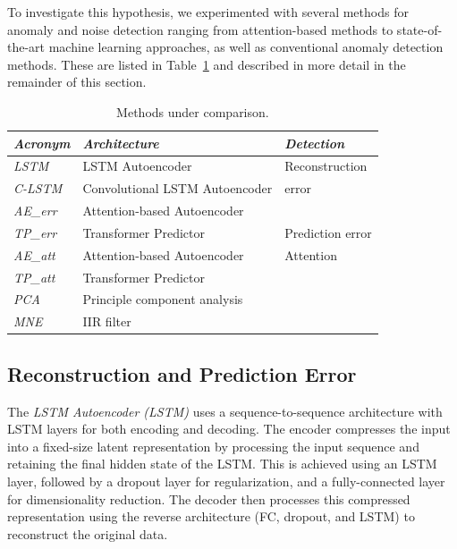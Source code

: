 \documentclass[runningheads]{llncs}
\begin{document}
To investigate this hypothesis, we experimented with several methods
for anomaly and noise detection ranging from attention-based methods
to state-of-the-art machine learning approaches, as well as
conventional anomaly detection methods. These are listed in
Table~\ref{tab1} and described in more detail in the remainder of this
section.


\begin{table}[bt]
\centering
\caption{Methods under comparison.}
\label{tab1}
\begin{tabular}{lp{4cm}p{2cm}}
\toprule
\emph{Acronym}   & \emph{Architecture}& \emph{Detection}  \\
\midrule
\textit{LSTM}    & LSTM Autoencoder   & Reconstruction  \\
\textit{C-LSTM}  & Convolutional LSTM Autoencoder
                                      & error  \\
\textit{AE\_err} & Attention-based Autoencoder
                                      &   \\
\midrule
\textit{TP\_err} & Transformer Predictor
                                      & Prediction error  \\
\midrule
\textit{AE\_att} & Attention-based Autoencoder
                                      & Attention \\
\textit{TP\_att} & Transformer Predictor &  \\
\midrule
\textit{PCA}     & \multicolumn{2}{l}{Principle component analysis} \\
\textit{MNE}     & \multicolumn{2}{l}{IIR filter} \\
\bottomrule
\end{tabular} 
\end{table}


\subsection{Reconstruction and Prediction Error}

The \emph{LSTM Autoencoder (LSTM)} uses a sequence-to-sequence
architecture with LSTM layers for both encoding and decoding. The
encoder compresses the input into a fixed-size latent representation
by processing the input sequence and retaining the final hidden state
of the LSTM. This is achieved using an LSTM layer, followed by a
dropout layer for regularization, and a fully-connected layer for
dimensionality reduction. The decoder then processes this compressed
representation using the reverse architecture (FC, dropout, and LSTM)
to reconstruct the original data.
\end{document}
